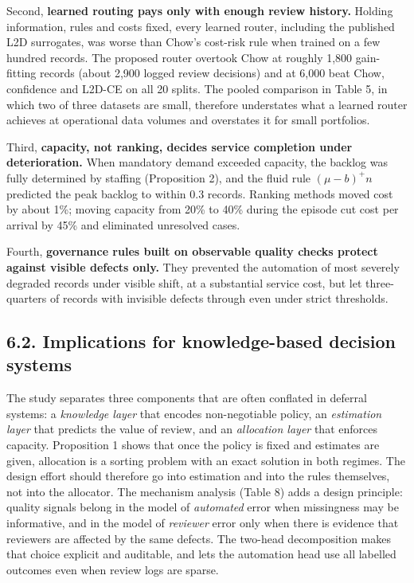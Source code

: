 \documentclass[
  11pt,
]{article}
\begin{document}
Second, \textbf{learned routing pays only with enough review history.}
Holding information, rules and costs fixed, every learned router,
including the published L2D surrogates, was worse than Chow's cost-risk
rule when trained on a few hundred records. The proposed router overtook
Chow at roughly 1,800 gain-fitting records (about 2,900 logged review
decisions) and at 6,000 beat Chow, confidence and L2D-CE on all 20
splits. The pooled comparison in Table 5, in which two of three datasets
are small, therefore understates what a learned router achieves at
operational data volumes and overstates it for small portfolios.

Third, \textbf{capacity, not ranking, decides service completion under
deterioration.} When mandatory demand exceeded capacity, the backlog was
fully determined by staffing (Proposition 2), and the fluid rule
\((\mu-b)^+n\) predicted the peak backlog to within 0.3 records. Ranking
methods moved cost by about 1\%; moving capacity from 20\% to 40\%
during the episode cut cost per arrival by 45\% and eliminated
unresolved cases.

Fourth, \textbf{governance rules built on observable quality checks
protect against visible defects only.} They prevented the automation of
most severely degraded records under visible shift, at a substantial
service cost, but let three-quarters of records with invisible defects
through even under strict thresholds.

\hypertarget{implications-for-knowledge-based-decision-systems}{%
\subsection{6.2. Implications for knowledge-based decision
systems}\label{implications-for-knowledge-based-decision-systems}}

The study separates three components that are often conflated in
deferral systems: a \emph{knowledge layer} that encodes non-negotiable
policy, an \emph{estimation layer} that predicts the value of review,
and an \emph{allocation layer} that enforces capacity. Proposition 1
shows that once the policy is fixed and estimates are given, allocation
is a sorting problem with an exact solution in both regimes. The design
effort should therefore go into estimation and into the rules
themselves, not into the allocator. The mechanism analysis (Table 8)
adds a design principle: quality signals belong in the model of
\emph{automated} error when missingness may be informative, and in the
model of \emph{reviewer} error only when there is evidence that
reviewers are affected by the same defects. The two-head decomposition
makes that choice explicit and auditable, and lets the automation head
use all labelled outcomes even when review logs are sparse.
\end{document}
